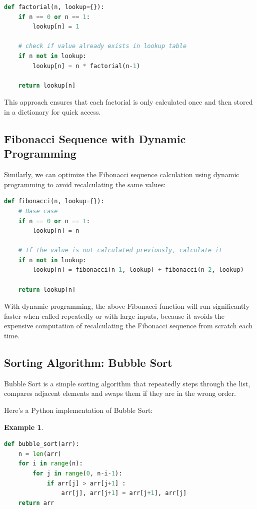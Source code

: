 \documentclass[12pt]{article}
\newtheorem{Example}{Example}[section]
\begin{document}
\begin{lstlisting}[language=Python]
def factorial(n, lookup={}):
    if n == 0 or n == 1:
        lookup[n] = 1

    # check if value already exists in lookup table
    if n not in lookup:
        lookup[n] = n * factorial(n-1)

    return lookup[n]
\end{lstlisting}

This approach ensures that each factorial is only calculated once and then stored in a dictionary for quick access.

\subsection{Fibonacci Sequence with Dynamic Programming}
Similarly, we can optimize the Fibonacci sequence calculation using dynamic programming to avoid recalculating the same values:

\begin{lstlisting}[language=Python]
def fibonacci(n, lookup={}):
    # Base case
    if n == 0 or n == 1:
        lookup[n] = n

    # If the value is not calculated previously, calculate it
    if n not in lookup:
        lookup[n] = fibonacci(n-1, lookup) + fibonacci(n-2, lookup)

    return lookup[n]
\end{lstlisting}

With dynamic programming, the above Fibonacci function will run significantly faster when called repeatedly or with large inputs, because it avoids the expensive computation of recalculating the Fibonacci sequence from scratch each time.

\subsection{Sorting Algorithm: Bubble Sort}
Bubble Sort is a simple sorting algorithm that repeatedly steps through the list, compares adjacent elements and swaps them if they are in the wrong order.


Here's a Python implementation of Bubble Sort:
\begin{Example}
\begin{lstlisting}[language=Python]
def bubble_sort(arr):
    n = len(arr)
    for i in range(n):
        for j in range(0, n-i-1):
            if arr[j] > arr[j+1] :
                arr[j], arr[j+1] = arr[j+1], arr[j]
    return arr
\end{lstlisting}
\end{Example}
\end{document}
